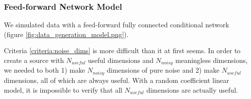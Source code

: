 \documentclass{article}
\begin{document}
\subsubsection{Feed-forward Network Model}

We simulated data with a feed-forward fully connected conditional network
(figure \ref{fig:data_generation_model.png}).


Criteria \ref{criteria:noise_dims} is more difficult than it at first seems. In
order to create a source with $N_{useful}$ useful dimensions and $N_{noisy}$
meaningless dimensions, we needed to both 1) make $N_{noisy}$ dimensions of pure
noise and 2) make $N_{useful}$ dimensions, all of which are always useful. With a
random coefficient linear model, it is impossible to verify that all $N_{useful}$
dimensions are actually useful.
\end{document}
